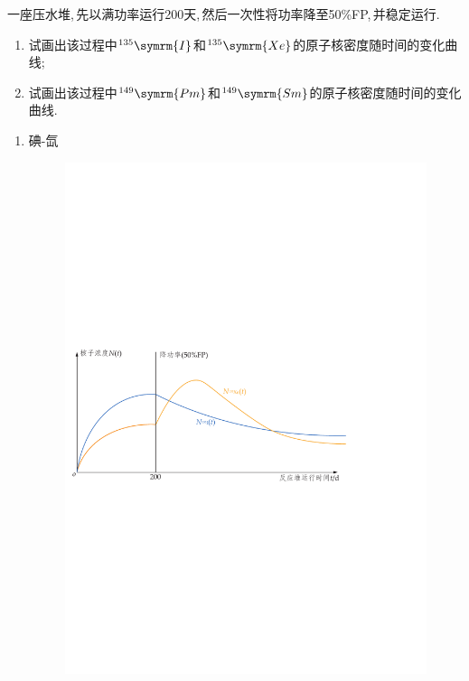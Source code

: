 \begin{exercise}
    一座压水堆,\,先以满功率运行200天,\,然后一次性将功率降至50\%FP,\,并稳定运行. 
    \begin{enumerate}[(1)]
        \item 试画出该过程中${}^{135}\symrm{I}$和${}^{135}\symrm{Xe}$的原子核密度随时间的变化曲线;
        \item 试画出该过程中${}^{149}\symrm{Pm}$和${}^{149}\symrm{Sm}$的原子核密度随时间的变化曲线.
    \end{enumerate}
    \begin{solution}
        \begin{enumerate}[(1)]
            \item 碘-氙
            \begin{figure}[H]
                \centering
                \includegraphics[scale=0.75]{figures/fig6.5.pdf}
            \end{figure}

\end{enumerate}
\end{solution}
\end{exercise}
